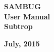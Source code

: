 \documentclass[11pt,a4paper,titlepage]{article}
\begin{document}

\begin{titlepage}
	
	
	\begin{center}
		\vspace*{-3cm}
	\end{center}
	
	
    \vspace*{2cm}
      \Huge \textbf {SAMBUG}\\
      
    \vspace*{-0.5cm}
	  \huge \textbf {User Manual}\\
	  
	\vspace*{-0.5cm}  
      \LARGE \textbf {Subtrop}
         
    \vskip2cm
          
    
    \large \textbf{July, 2015}
    \vfill
\end{titlepage}
	
	

\tableofcontents
\listoffigures
\end{document}
